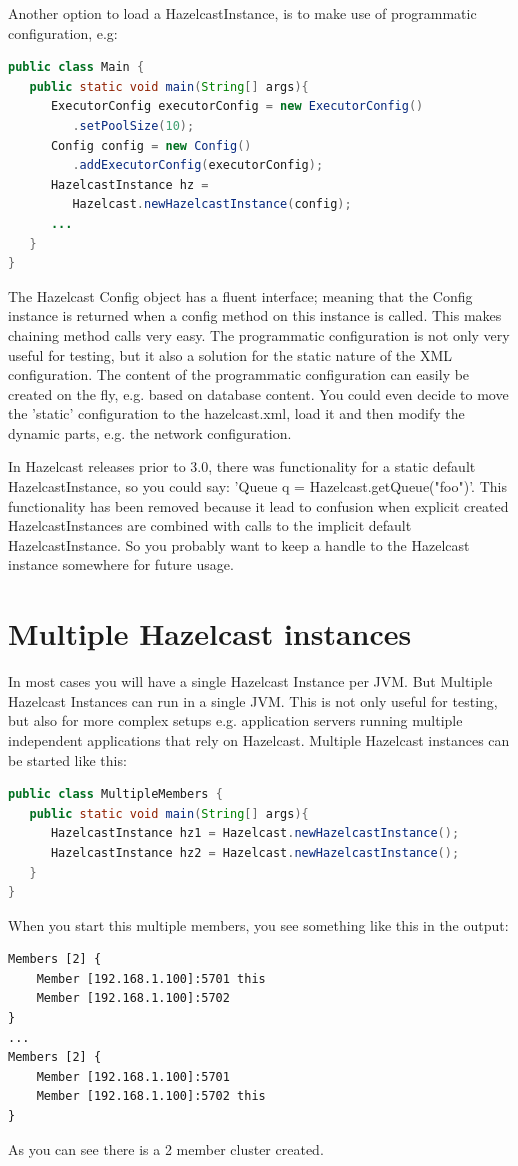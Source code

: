 Another option to load a HazelcastInstance, is to make use of programmatic configuration, e.g: 
\begin{lstlisting}[language=java]
public class Main {
   public static void main(String[] args){
      ExecutorConfig executorConfig = new ExecutorConfig()
         .setPoolSize(10);
      Config config = new Config()
         .addExecutorConfig(executorConfig);	  
      HazelcastInstance hz = 
         Hazelcast.newHazelcastInstance(config);
      ...
   }
}
\end{lstlisting}
The Hazelcast Config object has a fluent interface; meaning that the Config instance is returned when a config method on this instance is called. This makes chaining method calls very easy. The programmatic configuration is not only very useful for testing, but it also a solution for the static nature of the XML configuration. The content of the programmatic configuration can easily be created on the fly, e.g. based on database content. You could even decide to move the 'static' configuration to the hazelcast.xml, load it and then modify the dynamic parts, e.g. the network configuration.

In Hazelcast releases prior to 3.0, there was functionality for a static default HazelcastInstance, so you could say: 'Queue q = Hazelcast.getQueue("foo")'. This functionality has been removed because it lead to confusion when explicit created HazelcastInstances are combined with calls to the implicit default HazelcastInstance. So you probably want to keep a handle to the Hazelcast instance somewhere for future usage.

\section{Multiple Hazelcast instances}
In most cases you will have a single Hazelcast Instance per JVM. But Multiple Hazelcast Instances can run in a single JVM. This is not only useful for testing, but also for more complex setups e.g. application servers running multiple independent applications that rely on Hazelcast. Multiple Hazelcast instances can be started like this:
\begin{lstlisting}[language=java]
public class MultipleMembers {
   public static void main(String[] args){
      HazelcastInstance hz1 = Hazelcast.newHazelcastInstance();
      HazelcastInstance hz2 = Hazelcast.newHazelcastInstance();
   }
}
\end{lstlisting}
When you start this multiple members, you see something like this in the output:
\begin{lstlisting}
Members [2] {
    Member [192.168.1.100]:5701 this
    Member [192.168.1.100]:5702
}
...
Members [2] {
    Member [192.168.1.100]:5701
    Member [192.168.1.100]:5702 this
}
\end{lstlisting}
As you can see there is a 2 member cluster created.

